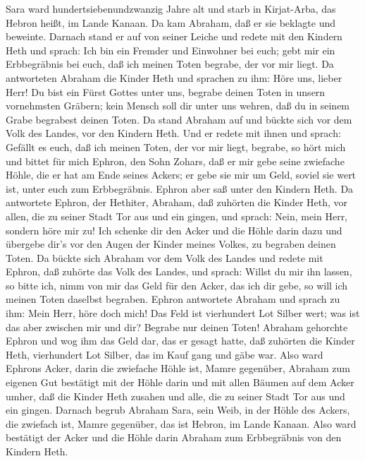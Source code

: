  Sara ward hundertsiebenundzwanzig Jahre alt 
und starb in Kirjat-Arba, das Hebron heißt, im Lande Kanaan. Da kam
Abraham, daß er sie beklagte und beweinte.  Darnach stand er
auf von seiner Leiche und redete mit den Kindern Heth und sprach:
 Ich bin ein Fremder und Einwohner bei euch; gebt mir ein
Erbbegräbnis bei euch, daß ich meinen Toten begrabe, der vor mir liegt.
 Da antworteten Abraham die Kinder Heth und sprachen zu ihm:
 Höre uns, lieber Herr! Du bist ein Fürst Gottes unter uns,
begrabe deinen Toten in unsern vornehmsten Gräbern; kein Mensch soll dir
unter uns wehren, daß du in seinem Grabe begrabest deinen Toten.
 Da stand Abraham auf und bückte sich vor dem Volk des
Landes, vor den Kindern Heth.  Und er redete mit ihnen und
sprach: Gefällt es euch, daß ich meinen Toten, der vor mir liegt,
begrabe, so hört mich und bittet für mich Ephron, den Sohn Zohars,
 daß er mir gebe seine zwiefache Höhle, die er hat am Ende
seines Ackers; er gebe sie mir um Geld, soviel sie wert ist, unter euch
zum Erbbegräbnis.  Ephron aber saß unter den Kindern Heth.
Da antwortete Ephron, der Hethiter, Abraham, daß zuhörten die Kinder
Heth, vor allen, die zu seiner Stadt Tor aus und ein gingen, und sprach:
 Nein, mein Herr, sondern höre mir zu! Ich schenke dir den
Acker und die Höhle darin dazu und übergebe dir's vor den Augen der
Kinder meines Volkes, zu begraben deinen Toten.  Da bückte
sich Abraham vor dem Volk des Landes  und redete mit
Ephron, daß zuhörte das Volk des Landes, und sprach: Willst du mir ihn
lassen, so bitte ich, nimm von mir das Geld für den Acker, das ich dir
gebe, so will ich meinen Toten daselbst begraben.  Ephron
antwortete Abraham und sprach zu ihm:  Mein Herr, höre doch
mich! Das Feld ist vierhundert Lot Silber wert; was ist das aber
zwischen mir und dir? Begrabe nur deinen Toten!  Abraham
gehorchte Ephron und wog ihm das Geld dar, das er gesagt hatte, daß
zuhörten die Kinder Heth, vierhundert Lot Silber, das im Kauf gang und
gäbe war.  Also ward Ephrons Acker, darin die zwiefache
Höhle ist, Mamre gegenüber, Abraham zum eigenen Gut bestätigt mit der
Höhle darin und mit allen Bäumen auf dem Acker umher,  daß
die Kinder Heth zusahen und alle, die zu seiner Stadt Tor aus und ein
gingen.  Darnach begrub Abraham Sara, sein Weib, in der
Höhle des Ackers, die zwiefach ist, Mamre gegenüber, das ist Hebron, im
Lande Kanaan.  Also ward bestätigt der Acker und die Höhle
darin Abraham zum Erbbegräbnis von den Kindern Heth.

